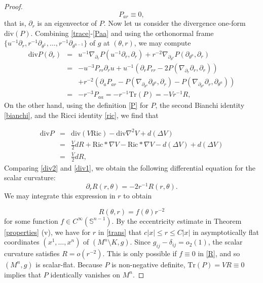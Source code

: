 \documentclass[12pt]{amsart}
\theoremstyle{definition}
\numberwithin{equation}{section}
\begin{document}
\begin{proof}
\begin{equation} \label{Paa}
    P_{ar} \equiv 0,
\end{equation}
that is, $\partial_{r}$ is an eigenvector of $P$. Now let us consider the divergence one-form $\text{div}\left( P \right)$. Combining \eqref{trace}-\eqref{Paa} and using the orthonormal frame $\{ u^{-1} \partial_{r}, r^{-1} \partial_{\theta^{1}}, \dots, r^{-1} \partial_{\theta^{n-1}} \}$ of $g$ at $(\theta,r)$, we may compute
\begin{eqnarray} \label{div2}
    \text{div} P (\partial_{r}) &=& u^{-1} \nabla_{\partial_{r}} P(u^{-1} \partial_{r},\partial_{r}) + r^{-2} \nabla_{\partial_{\theta^{a}}} P(\partial_{\theta^{a}},\partial_{r}) \nonumber \\
    &=& - u^{-3} P_{rr} \partial_{r} u + u^{-1} \left( \partial_{r} P_{rr} - 2P(\nabla_{\partial_{r}} \partial_{r}, \partial_{r}) \right) \\
    & & + r^{-2} \left( \partial_{a} P_{ar} - P(\nabla_{\partial_{\theta^{a}}} \partial_{\theta^{a}}, \partial_{r}) - P(\nabla_{\partial_{\theta^{a}}} \partial_{r}, \partial_{\theta^{a}}) \right) \nonumber \\
    &=& -r^{-3} P_{aa} = - r^{-1} \text{Tr}\left( P \right) = - V r^{-1} R, \nonumber
\end{eqnarray}
On the other hand, using the definition \eqref{P} for $P$, the second Bianchi identity \eqref{bianchi}, and the Ricci identity \eqref{ric}, we find that

\begin{eqnarray} \label{div1}
    \text{div} P &=& \text{div} \left( V \text{Ric} \right)  - \text{div} \nabla^{2} V + d (\Delta V) \nonumber \\
                     &=& \frac{V}{2} d R + \text{Ric} * \nabla V - \text{Ric} * \nabla V - d(\Delta V) + d(\Delta V) \nonumber \\
                     &=& \frac{V}{2} d R,
\end{eqnarray}
Comparing \eqref{div2} and \eqref{div1}, we obtain the following differential equation for the scalar curvature:
\begin{equation*}
    \partial_{r} R (r,\theta)= -2r^{-1} R(r,\theta).
\end{equation*}
We may integrate this expression in $r$ to obtain

\begin{equation} \label{R}
    R(\theta,r) = f(\theta) r^{-2}
\end{equation}
for some function $f \in C^{\infty} (\mathbb{S}^{n-1})$. By the eccentricity estimate in Theorem \ref{properties} (v), we have for $r$ in \eqref{trans} that $c |x| \leq r \leq C |x|$ in asymptotically flat coordinates $(x^{1}, \dots, x^{n})$ of $(M^{n} \setminus K, g)$. Since $g_{ij} - \delta_{ij} =o_{2}(1)$, the scalar curvature satisfies $R = o(r^{-2})$. This is only possible if $f \equiv 0$ in \eqref{R}, and so $(M^{n},g)$ is scalar-flat. 
Because $P$ is non-negative definite, $\text{Tr}(P) = VR \equiv 0$ implies that $P$ identically vanishes on $M^{n}$. 
\end{proof}
\end{document}
